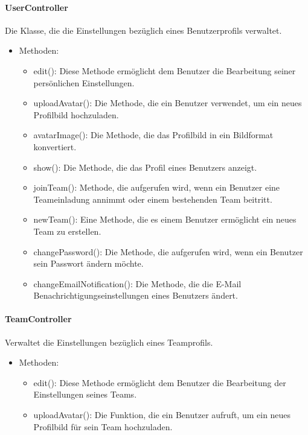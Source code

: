 	\paragraph{UserController}Die Klasse, die die Einstellungen bez\"uglich eines Benutzerprofils verwaltet.
		\begin{itemize}
			\item Methoden:
			\begin{itemize}
				\item edit(): Diese Methode erm\"oglicht dem Benutzer die Bearbeitung seiner pers\"onlichen Einstellungen.
				\item uploadAvatar(): Die Methode, die ein Benutzer verwendet, um ein neues Profilbild hochzuladen.
				\item avatarImage(): Die Methode, die das Profilbild in ein Bildformat konvertiert.
				\item show(): Die Methode, die das Profil eines Benutzers anzeigt.
				\item joinTeam(): Methode, die aufgerufen wird, wenn ein Benutzer eine Teameinladung annimmt oder einem bestehenden Team beitritt.
				\item newTeam(): Eine Methode, die es einem Benutzer erm\"oglicht ein neues Team zu erstellen.
				\item changePassword(): Die Methode, die aufgerufen wird, wenn ein Benutzer sein Passwort \"andern m\"ochte.
				\item changeEmailNotification(): Die Methode, die die E-Mail Benachrichtigungseinstellungen eines Benutzers \"andert.
			\end{itemize}
		\end{itemize}
	\paragraph{TeamController}Verwaltet die Einstellungen bez\"uglich eines Teamprofils.
		\begin{itemize}
			\item Methoden:
			\begin{itemize}
				\item edit(): Diese Methode erm\"oglicht dem Benutzer die Bearbeitung der Einstellungen seines Teams.
				\item uploadAvatar(): Die Funktion, die ein Benutzer aufruft, um ein neues Profilbild f\"ur sein Team hochzuladen.
			\end{itemize}
		\end{itemize}
